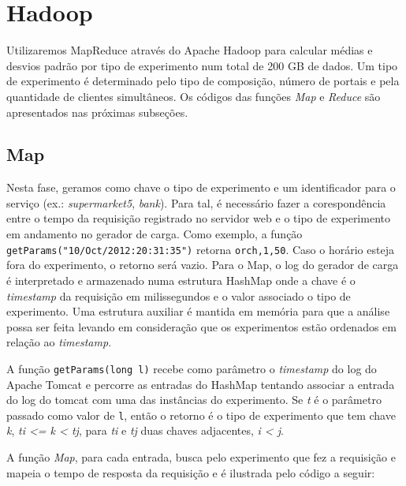 \documentclass[brazil, a4paper,12pt]{article}
\begin{document}
\section{Hadoop}

Utilizaremos MapReduce através do Apache Hadoop para calcular médias e desvios padrão por tipo de experimento num total de 200 GB de dados. Um tipo de experimento é determinado pelo tipo de composição, número de portais e pela quantidade de clientes simultâneos. Os códigos das funções \emph{Map} e \emph{Reduce} são apresentados nas próximas subseções.

\subsection{Map}

Nesta fase, geramos como chave o tipo de experimento e um identificador para o serviço (ex.: \emph{supermarket5}, \emph{bank}). Para tal, é necessário fazer a corespondência entre o tempo da requisição registrado no servidor web e o tipo de experimento em andamento no gerador de carga. Como exemplo, a função \\ \verb|getParams("10/Oct/2012:20:31:35")| retorna \verb/orch,1,50/. Caso o horário esteja fora do experimento, o retorno será vazio. Para o Map, o log do gerador de carga é interpretado e armazenado numa estrutura HashMap onde a chave é o \textit{timestamp} da requisição em milissegundos e o valor associado o tipo de experimento. Uma estrutura auxiliar é mantida em memória para que a análise possa ser feita levando em consideração que os experimentos estão ordenados em relação ao \textit{timestamp}.

A função \verb|getParams(long l)| recebe como parâmetro o \textit{timestamp} do log do Apache Tomcat e percorre as entradas do HashMap tentando associar a entrada do log do tomcat com uma das instâncias do experimento. Se \textit{t} é o parâmetro passado como valor de \verb/l/, então o retorno é o tipo de experimento que tem chave \textit{k}, \textit{ti <= k < tj}, para \textit{ti} e \textit{tj} duas chaves adjacentes, \textit{i < j}. 

A função \emph{Map}, para cada entrada, busca pelo experimento que fez a requisição e mapeia o tempo de resposta da requisição e é ilustrada pelo código a seguir:
\end{document}
